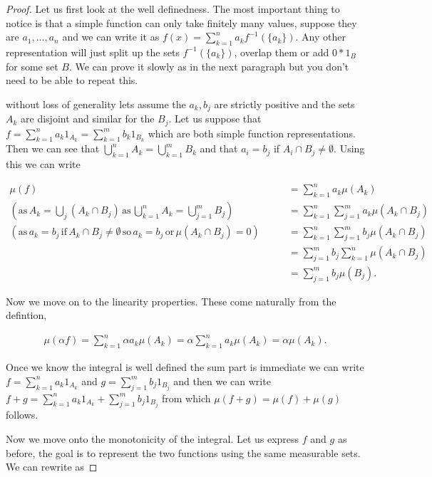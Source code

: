 \documentclass[
]{book}
\theoremstyle{definition}
\theoremstyle{definition}
\theoremstyle{definition}
\theoremstyle{definition}
\theoremstyle{remark}
\begin{document}
\begin{proof}
Let us first look at the well definedness. The most important thing to notice is that a simple function can only take finitely many values, suppose they are \(a_1, \dots, a_n\) and we can write it as \(f(x) = \sum_{k=1}^n a_k f^{-1}(\{a_k\})\). Any other representation will just split up the sets \(f^{-1}(\{a_k\})\), overlap them or add \(0*1_{B}\) for some set \(B\). We can prove it slowly as in the next paragraph but you don't need to be able to repeat this.

without loss of generality lets assume the \(a_k, b_j\) are strictly positive and the sets \(A_k\) are disjoint and similar for the \(B_j\). Let us suppose that \(f = \sum_{k=1}^n a_k 1_{A_k} = \sum_{k=1}^m b_k 1_{B_k}\) which are both simple function representations. Then we can see that \(\bigcup_{k=1}^nA_k = \bigcup_{k=1}^m B_k\) and that \(a_i =b_j\) if \(A_i \cap B_j \neq \emptyset\). Using this we can write

\begin{align*} 
\mu(f) &= \sum_{k=1}^n a_k \mu(A_k)\\
\left(\mbox{as}\, A_k = \bigcup_j (A_k \cap B_j)\, \mbox{as}\, \bigcup_{k=1}^nA_k = \bigcup_{j=1}^m B_j\right) \quad \quad &= \sum_{k=1}^n \sum_{j=1}^m a_k \mu(A_k \cap B_j) \\
\left(\mbox{as}\, a_k = b_j\, \mbox{if}\, A_k \cap B_j \neq \emptyset\, \mbox{so}\, a_k=b_j\, \mbox{or}\, \mu(A_k\cap B_j) = 0\right) \quad \quad & = \sum_{k=1}^n \sum_{j=1}^m b_j \mu(A_k \cap B_j) \\
&= \sum_{j=1}^m b_j \sum_{k=1}^n \mu(A_k \cap B_j) \\
&= \sum_{j=1}^m b_j \mu(B_j).
\end{align*}

Now we move on to the linearity properties. These come naturally from the defintion,

\begin{align*}
\mu(\alpha f) = \sum_{k=1}^n \alpha a_k \mu(A_k) = \alpha \sum_{k=1}^n a_k \mu(A_k) = \alpha \mu(A_k).
\end{align*}

Once we know the integral is well defined the sum part is immediate we can write \(f=\sum_{k=1}^n a_k 1_{A_k}\) and \(g= \sum_{j=1}^m b_j 1_{B_j}\) and then we can write \(f+g = \sum_{k=1}^n a_k 1_{A_k} + \sum_{j=1}^m b_j 1_{B_j}\) from which \(\mu(f+g) = \mu(f) + \mu(g)\) follows.

Now we move onto the monotonicity of the integral. Let us express \(f\) and \(g\) as before, the goal is to represent the two functions using the same measurable sets. We can rewrite as


\end{proof}
\end{document}
